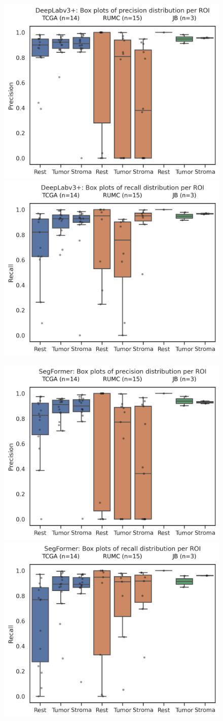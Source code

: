 \begin{figure}[H]
\includegraphics[width=.5\linewidth]{figures/tissue/deeplabv3+_prec_roi_wsirois.png}
\includegraphics[width=.5\linewidth]{figures/tissue/deeplabv3+_recall_roi_wsirois.png}

\includegraphics[width=.5\linewidth]{figures/tissue/segformer_prec_roi_wsirois.png}
\includegraphics[width=.5\linewidth]{figures/tissue/segformer_recall_roi_wsirois.png}


\end{figure}
